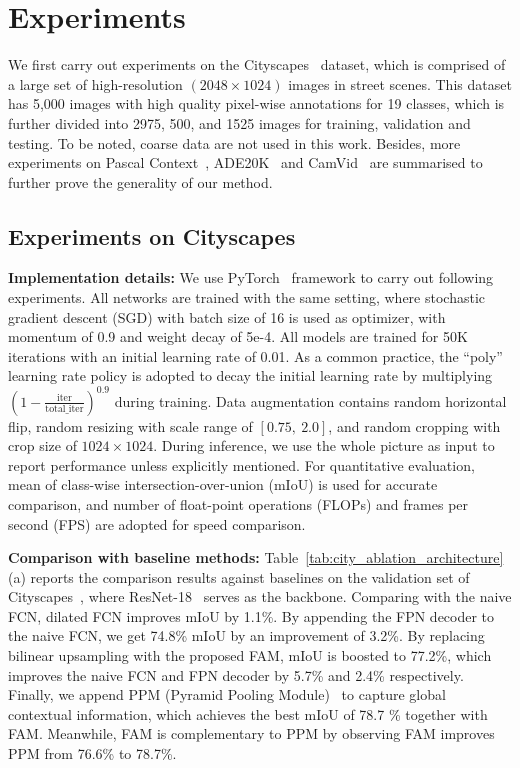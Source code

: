 
\section{Experiments}
We first carry out experiments on the Cityscapes~\cite{Cityscapes} dataset, which is comprised of a large set of high-resolution $(2048 \times 1024)$ images in street scenes. This dataset has 5,000 images with high quality pixel-wise annotations for 19 classes, which is further divided into 2975, 500, and 1525 images for training, validation and testing. To be noted, coarse data are not used in this work. Besides, more experiments on Pascal Context~\cite{VOC}, ADE20K~\cite{ADE20K} and CamVid~\cite{CamVid} are summarised to further prove the generality of our method. 

\subsection{Experiments on Cityscapes}

\noindent
\textbf{Implementation details:} We use PyTorch~\cite{pytorch} framework to carry out following experiments. All networks are trained with the same setting, where stochastic gradient descent (SGD) with batch size of 16 is used as optimizer, with momentum of 0.9 and weight decay of 5e-4. All models are trained for 50K iterations with an initial learning rate of 0.01. As a common practice, the ``poly'' learning rate policy is adopted to decay the initial learning rate by multiplying $(1 -\frac{\text{iter}}{\text{total}\_\text{iter}})^{0.9}$ during training. Data augmentation contains random horizontal flip, random resizing with scale range of $[0.75, ~2.0]$, and random cropping with crop size of $1024 \times 1024$. During inference, we use the whole picture as input to report performance unless explicitly mentioned. For quantitative evaluation, mean of class-wise intersection-over-union (mIoU) is used for accurate comparison, and number of float-point operations (FLOPs) and frames per second (FPS) are adopted for speed comparison.

\noindent
\textbf{Comparison with baseline methods: } Table~\ref{tab:city_ablation_architecture}(a) reports the  comparison results against baselines on the validation set of Cityscapes~\cite{Cityscapes}, where ResNet-18~\cite{resnet} serves as the backbone. Comparing with the naive FCN, dilated FCN improves mIoU by 1.1\%.  By appending the FPN decoder to the naive FCN, we get 74.8\% mIoU by an improvement of 3.2\%. By replacing bilinear upsampling with the proposed FAM, mIoU is boosted to 77.2\%, which improves the naive FCN and FPN decoder by 5.7\% and 2.4\% respectively. Finally, we append PPM (Pyramid Pooling Module)~\cite{pspnet} to capture global contextual information, which achieves the best mIoU of 78.7 \% together with FAM. Meanwhile, FAM is complementary to PPM by observing FAM improves PPM from 76.6\% to 78.7\%.

